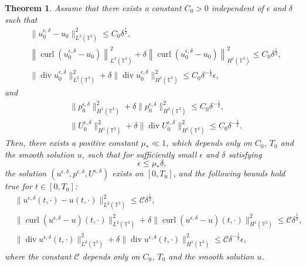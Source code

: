 \documentclass[reqno,10pt]{amsart}
\newtheorem{theorem}{Theorem}[section]
\theoremstyle{definition}
\theoremstyle{remark}
\numberwithin{equation}{section}
\DeclareMathOperator{\dive}{div}
\DeclareMathOperator{\curl}{curl}
\begin{document}
\begin{theorem} \label{thm:critical_3d_inhomo}
Assume that there exists a constant $C_0>0$ independent of $\epsilon$ and $\delta$ such that
\begin{subequations}
\begin{align}
    &\|u^{\epsilon,\delta}_0-u_0\|_{L^2(\mathbb T^3)}^2 \le C_0\delta^{\frac{1}{2}}, \\
    &\left\|\curl\left(u^{\epsilon,\delta}_0 - u_0\right)\right\|_{L^2(\mathbb T^3)}^2 + \delta\left\|\curl\left(u^{\epsilon,\delta}_0 - u_0\right)\right\|_{H^1(\mathbb T^3)}^2 \le C_0\delta^{\frac{1}{2}}, \\
    & \|\dive u^{\epsilon,\delta}_0\|_{L^2(\mathbb T^3)}^2 + \delta \|\dive u^{\epsilon,\delta}_0\|_{H^1(\mathbb T^3)}^2 \le C_0\delta^{-\frac{1}{2}}\epsilon,
\end{align}
\end{subequations}    
and
\begin{subequations}
\begin{align}
    &\|p^{\epsilon,\delta}_0\|_{H^1(\mathbb T^3)}^2 + \delta\|p^{\epsilon,\delta}_0\|_{H^2(\mathbb T^3)}^2 \le C_0\delta^{-\frac{1}{2}}, \\
    & \|U^{\epsilon,\delta}_0\|_{H^1(\mathbb T^3)}^2 + \delta \|\dive U^{\epsilon,\delta}_0\|_{H^1(\mathbb T^3)}^2 \le C_0\delta^{-\frac{1}{2}}.
\end{align}
\end{subequations}
Then, there exists a positive constant $\mu_*\ll 1$, which depends only on $C_0$, $T_0$ and the smooth solution $u$, such that for sufficiently small $\epsilon$ and $\delta$ satisfying
\begin{equation} \label{eq:relation_3d_inhomo}
    \epsilon \le \mu_* \delta,
\end{equation}
the solution $(u^{\epsilon,\delta},p^{\epsilon,\delta},U^{\epsilon,\delta})$ exists on $[0,T_0]$, and the following bounds hold true for $t\in[0,T_0]$:
\begin{subequations} \label{eq:bounds_critcoro}
\begin{align}
    &\|u^{\epsilon,\delta}(t,\cdot)-u(t,\cdot)\|_{L^2(\mathbb T^3)}^2\le \mathcal C\delta^{\frac{1}{2}}, \label{eq:bounds_critcoro_u} \\
    &\|\curl (u^{\epsilon,\delta}-u)(t,\cdot)\|_{L^2(\mathbb T^3)}^2 + \delta \|\curl (u^{\epsilon,\delta}-u)(t,\cdot)\|_{H^1(\mathbb T^3)}^2 \le \mathcal C\delta^{\frac{1}{2}}, \label{eq:bounds_critcoro_curl} \\
    &\|\dive u^{\epsilon,\delta}(t,\cdot)\|_{L^2(\mathbb T^3)}^2 + \delta \|\dive u^{\epsilon,\delta}(t,\cdot)\|_{H^1(\mathbb T^3)}^2 \le \mathcal C\delta^{-\frac{1}{2}}\epsilon, \label{eq:bounds_critcoro_div}
\end{align}
\end{subequations}
where the constant $\mathcal C$ depends only on $C_0$, $T_0$ and the smooth solution $u$.
\end{theorem}
\end{document}
